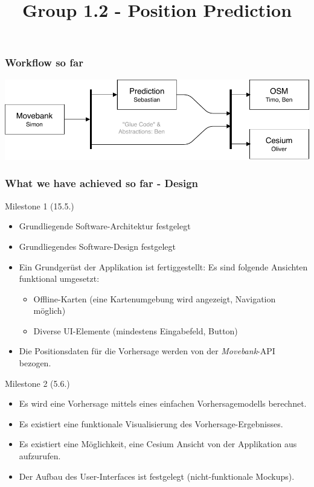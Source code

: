 \documentclass[xcolor=dvipsnames]{beamer}
\title[] {Group 1.2 - Position Prediction}
\date{} %
\begin{document}
\frame{\titlepage}

\begin{frame}
	\frametitle{Workflow so far}
	\includegraphics[width=\textwidth]{diagrams/Tasks.pdf}
\end{frame}

\begin{frame}
	\frametitle{What we have achieved so far - Design}
	\large{Milestone 1 (15.5.)}
	\normalsize
	\begin{itemize} 
		\item \color{Green}Grundliegende Software-Architektur festgelegt
		\item \color{Green}Grundliegendes Software-Design festgelegt
		\item \color{Green}Ein Grundgerüst der Applikation ist fertiggestellt: Es sind folgende Ansichten funktional umgesetzt:
		\begin{itemize} 
			\item \color{Green}Offline-Karten (eine Kartenumgebung wird angezeigt, Navigation möglich)
			\item \color{Green}Diverse UI-Elemente (mindestens Eingabefeld, Button)
		\end{itemize} 
		\item \color{LightGray}Die Positionsdaten für die Vorhersage werden von der \textit{Movebank}-API bezogen.
	\end{itemize}     
	\large{Milestone 2 (5.6.)}
	\normalsize
	\begin{itemize} 
		\item \color{LightGray}Es wird eine Vorhersage mittels eines einfachen Vorhersagemodells berechnet.
		\item \color{LightGray}Es existiert eine funktionale Visualisierung des Vorhersage-Ergebnisses.
		\item \color{LightGray}Es existiert eine Möglichkeit, eine Cesium Ansicht von der Applikation aus aufzurufen.
		\item \color{Green}Der Aufbau des User-Interfaces ist festgelegt (nicht-funktionale Mockups).
	\end{itemize}
\end{frame}
\end{document}
